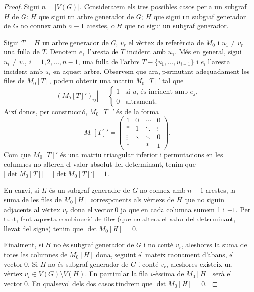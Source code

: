 \documentclass{article}
\begin{document}
\begin{proof}
    Sigui $n=|V(G)|$. Considerarem els tres possibles casos per a un subgraf $H$ de $G$: $H$ que sigui un arbre generador de $G$; $H$ que sigui un subgraf generador de $G$ no connex amb $n-1$ arestes, o $H$ que no sigui un subgraf generador.\par
    Sigui $T=H$ un arbre generador de $G$, $v_r$ el vèrtex de referència de $M_0$ i $u_1\ne v_r$ una fulla de $T$. Denotem $e_1$ l'aresta de $T$ incident amb $u_1$. Més en general, sigui $u_i\ne v_r$, $i=1,2,\ldots, n-1$, una fulla de l'arbre $T-\{u_1,\ldots,u_{i-1}\}$ i $e_i$ l'aresta incident amb $u_i$ en aquest arbre. Observem que ara, permutant adequadament les files de $M_0[T]$, podem obtenir una matriu $M_0[T]'$ tal que
    $$
        |(M_0[T]')_{ij}|=\left\{\begin{array}{ll}
            1 & \text{si $u_i$ és incident amb $e_j$,} \\
            0 & \text{altrament.}
        \end{array}\right.$$
    Així doncs, per construcció, $M_0[T]'$ és de la forma
    $$M_0[T]'=\begin{pmatrix}
            1      & 0      & \cdots & 0      \\
            *      & 1      & \ddots & \vdots \\
            \vdots & \ddots & \ddots & 0      \\
            *      & \cdots & *      & 1
        \end{pmatrix}.$$
    Com que $M_0[T]'$ és una matriu triangular inferior i permutacions en les columnes no alteren el valor absolut del determinant, tenim que $|\det M_0[T]|=|\det M_0[T]'|=1$.\par
    En canvi, si $H$ és un subgraf generador de $G$ no connex amb $n-1$ arestes, la suma de les files de $M_0[H]$ corresponents als vèrtexs de $H$ que no siguin adjacents al vèrtex $v_r$ dona el vector 0 ja que en cada columna sumem 1 i $-1$. Per tant, fent aquesta combinació de files (que no altera el valor del determinant, llevat del signe) tenim que $\det M_0[H]=0$.\par
    Finalment, si $H$ no és subgraf generador de $G$ i no conté $v_r$, aleshores la suma de totes les columnes de $M_0[H]$ dona, seguint el mateix raonament d'abans, el vector 0. Si $H$ no és subgraf generador de $G$ i conté $v_r$, aleshores existeix un vèrtex $v_i\in V(G)\setminus V(H)$. En particular la fila $i$-èssima de $M_0[H]$ serà el vector 0. En qualsevol dels dos casos tindrem que $\det M_0[H]=0$. \cite{1}
\end{proof}
\end{document}
